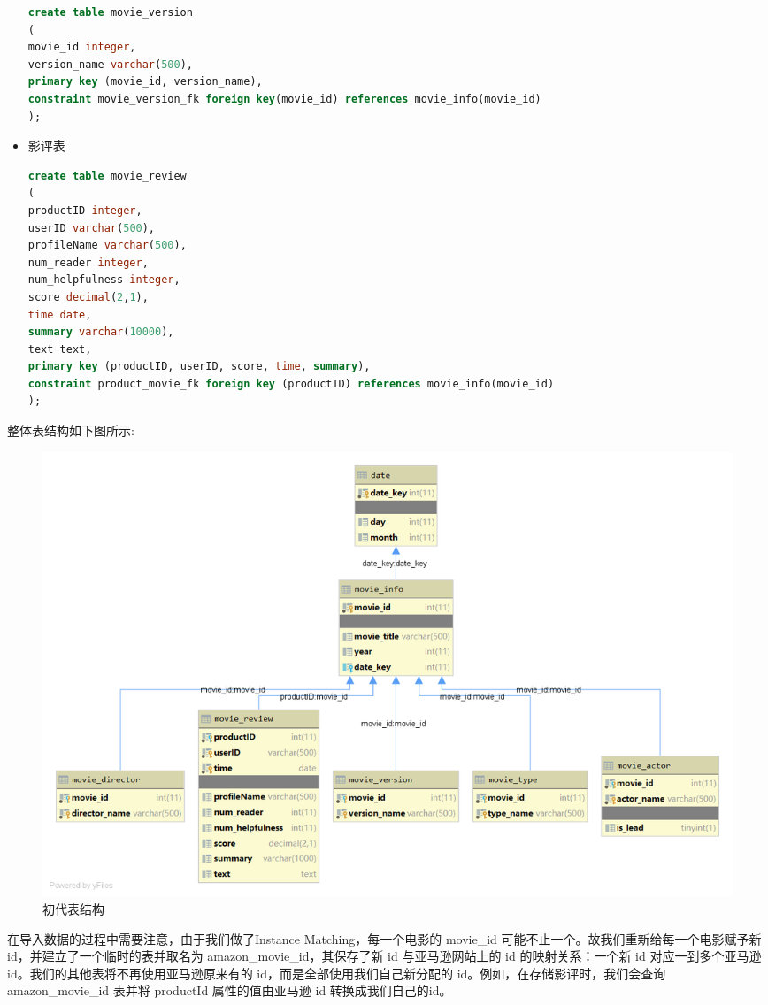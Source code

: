 \documentclass{ctexrep}
\begin{document}
\begin{itemize}
\begin{lstlisting}[language=sql]
create table movie_version
(
movie_id integer,
version_name varchar(500),
primary key (movie_id, version_name),
constraint movie_version_fk foreign key(movie_id) references movie_info(movie_id)
);
            \end{lstlisting}
        \item 影评表
            \begin{lstlisting}[language=sql]
create table movie_review
(
productID integer,
userID varchar(500),
profileName varchar(500),
num_reader integer,
num_helpfulness integer,
score decimal(2,1),
time date,
summary varchar(10000),
text text,
primary key (productID, userID, score, time, summary),
constraint product_movie_fk foreign key (productID) references movie_info(movie_id)
);
            \end{lstlisting}
	\end{itemize}
    整体表结构如下图所示:
    \begin{figure}[H]
		\centering
		\includegraphics[width=0.7\linewidth]{img/MySQL_DB1.png}
		\caption{初代表结构}
		\label{fig:MySQL_DB1}
	\end{figure}
	在导入数据的过程中需要注意，由于我们做了Instance Matching，每一个电影的 movie\_id 可能不止一个。故我们重新给每一个电影赋予新id，并建立了一个临时的表并取名为 amazon\_movie\_id，其保存了新 id 与亚马逊网站上的 id 的映射关系：一个新 id 对应一到多个亚马逊 id。我们的其他表将不再使用亚马逊原来有的 id，而是全部使用我们自己新分配的 id。例如，在存储影评时，我们会查询 amazon\_movie\_id 表并将 productId 属性的值由亚马逊 id 转换成我们自己的id。
\end{document}
